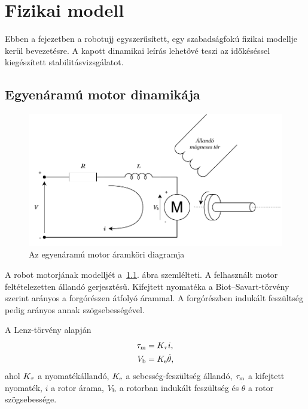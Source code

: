 \chapter{Fizikai modell}\label{chap:physical_system}

Ebben a fejezetben a robotujj egyszerűsített, egy szabadságfokú fizikai modellje kerül 
bevezetésre. A kapott dinamikai leírás lehetővé teszi az időkéséssel kiegészített 
stabilitásvizsgálatot. 

\section{Egyenáramú motor dinamikája}

\begin{figure}[b!]
\begin{center}
\includegraphics[width=\textwidth]{images/motor_model_electric.pdf}
\caption{Az egyenáramú motor áramköri diagramja}
\label{fig:dc_motor_electric}
\end{center}
\end{figure}

A robot motorjának modelljét a~\ref{fig:dc_motor_electric}. ábra szemlélteti. 
A felhasznált motor feltételezetten állandó gerjesztésű. Kifejtett nyomatéka a 
Biot--Savart-törvény szerint arányos a forgórészen átfolyó árammal. A forgórészben
indukált feszültség pedig arányos annak szögsebességével. 

A Lenz-törvény alapján 
\begin{equation}\label{eq:lenz_torque}
\begin{split}
    \tau_{\mathrm{m}} &= K_{\mathrm{\tau}} i, \\
    V_{\mathrm{b}} &= K_{\mathrm{e}} \dot\theta,
\end{split}
\end{equation}
ahol $K_{\mathrm{\tau}}$ a nyomatékállandó, $K_{\mathrm{e}}$ a sebesség-feszültség állandó, $\tau_{\mathrm{m}}$ a kifejtett 
nyomaték, $i$ a rotor árama, $V_{\mathrm{b}}$ a rotorban indukált feszültség és $\dot\theta$ a rotor szögsebessége.

